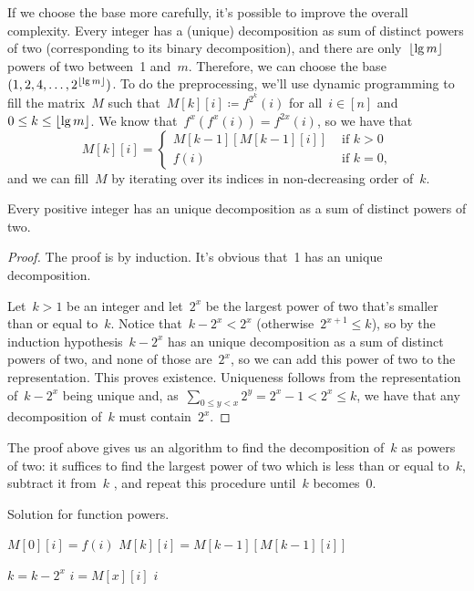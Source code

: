 \documentclass[main.tex]{subfiles}
\begin{document}
If we choose the base more carefully, it's possible to improve the overall complexity. Every integer has a (unique) decomposition as sum of distinct powers of two (corresponding to its binary decomposition), and there are only~$\lfloor\lg m\rfloor$ powers of two between~1 and~$m$. Therefore, we can choose the base~${(1, 2, 4, \ldots, 2^{\lfloor\lg m\rfloor})}$. To do the preprocessing, we'll use dynamic programming to fill the matrix~$M$ such that~$M[k][i] \coloneqq f^{2^k}(i)$ for all~$i \in [n]$ and~$0 \leq k \leq \lfloor\lg m\rfloor$. We know that~$f^x(f^x(i)) = f^{2x}(i)$, so we have that
$$M[k][i] = \left\{
	\begin{array}{ll}
		M[k-1][M[k - 1][i]] & \text{ if $k > 0$} \\
		f(i) & \text{ if $k = 0$,}
	\end{array}
	\right.
$$
and we can fill~$M$ by iterating over its indices in non-decreasing order of~$k$.

\begin{theorem} \label{thm:pot2}
        Every positive integer has an unique decomposition as a sum of distinct powers of two.
\end{theorem}
\begin{proof}
    The proof is by induction. It's obvious that~1 has an unique decomposition.

    Let~$k > 1$ be an integer and let~$2^x$ be the largest power of two that's smaller than or equal to~$k$. Notice that~$k - 2^x < 2^x$ (otherwise~$2^{x+1} \leq k$), so by the induction hypothesis~$k - 2^x$ has an unique decomposition as a sum of distinct powers of two, and none of those are~$2^x$, so we can add this power of two to the representation. This proves existence. Uniqueness follows from the representation of~$k - 2^x$ being unique and, as~$\sum\limits_{0 \leq y < x}{2^{y}} = 2^x - 1 < 2^x \leq k$, we have that any decomposition of~$k$ must contain~$2^x$.
\end{proof}

The proof above gives us an algorithm to find the decomposition of~$k$ as powers of two: it suffices to find the largest power of two which is less than or equal to~$k$, subtract it from~$k$ , and repeat this procedure until~$k$ becomes~0.

\begin{algorithm}
	\caption{Solution for function powers.} \label{lst:potfunclg}
\begin{algorithmic}[1]
			\State $M[0][i] = f(i)$
		\EndFor
				\State $M[k][i] = M[k - 1][M[k - 1][i]]$
			\EndFor
		\EndFor
	\EndFunction

	 
				\State $k = k - 2^x$
				\State $i = M[x][i]$
			\EndIf
		\EndFor
		\State \Return $i$
	\EndFunction
\end{algorithmic}
\end{algorithm}
\end{document}
